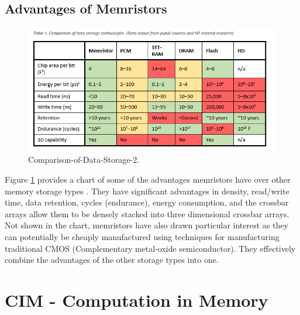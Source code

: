 \documentclass{sig-alternate}
\begin{document}
\subsection{Advantages of Memristors}
\begin{figure}
  \includegraphics[width=\linewidth]{Comparison-of-Data-Storage-2.png}
  \caption{Comparison-of-Data-Storage-2.}
  \label{fig:DATA}
\end{figure}
\label{sec:inlineEquations}

Figure \ref{fig:DATA} provides a chart of some of the advantages memristors have over other memory storage types \cite{HPmemStuff}.  They have significant advantages in density, read/write time, data retention, cycles (endurance), energy consumption, and the crossbar arrays allow them to be densely stacked into three dimensional crossbar arrays.  Not shown in the chart, memristors have also drawn particular interest as they can potentially be cheaply manufactured using techniques for manufacturing traditional CMOS (Complementary metal-oxide semiconductor).  They effectively combine the advantages of the other storage types into one.




\section{CIM - Computation in Memory}
\label{sec:citations}
\end{document}
